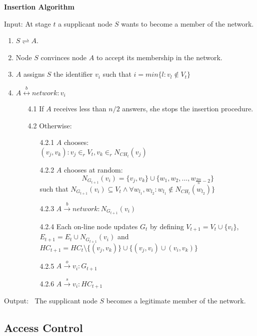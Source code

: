 \documentclass{article}
\begin{document}
{\bf Insertion Algorithm}

Input: At stage $t$ a supplicant node $S$ wants to become a member
of the network.
\begin{enumerate}
	\item $S\rightleftharpoons A$.
	\item Node $S$ convinces node $A$ to accept its membership in the network.
  \item  $A$ assigns $S$ the identifier $v_i$ such that $i = min \{l: v_l \not \in V_t \}$
  \item $ A \stackrel{b}{\leftrightarrow} network: v_i$ 
  \begin {itemize}
      \item [4.1] If $A$ receives less than $n/2$ answers, she stops the insertion procedure.
      \item [4.2]Otherwise:
      \begin{itemize}
            \item [4.2.1]$A$ chooses:\\
            $(v_j,v_k): v_j\in _r V_t,v_k \in _r N_{CH_t}(v_j)$
            \item [4.2.2]$A$ chooses at random:\\
            $$N_{G_{t+1}}(v_i)= \{v_j, v_k\} \cup \{ w_1,w_2,..., w_{\frac{2m}{n} -2}\}$$  such that
            $ N_{G_{t+1}}(v_i) \subseteq V_t \wedge \forall w_{l_1},w_{l_2}: w_{l_1} \not \in N_{CH_t}(w_{l_2})\}$
            \item [4.2.3] $ A \stackrel{b}{\rightarrow} network: N_{G_{t+1}}(v_i)$
            \item [4.2.4]Each on-line node updates $G_t$ by defining $V_{t+1}=V_t \cup \{v_i\}$, $E_{t+1}=E_t \cup 							N_{G_{t+1}}(v_i)$ and
     				$HC_{t+1}= HC_t \setminus \{(v_j, v_k)\} \cup \{(v_j,v_i) \cup (v_i, v_k)\}$
    				\item [4.2.5] $A \stackrel{o}{\rightarrow} v_i: G_{t+1}$
    				\item [4.2.6] $A \stackrel{s}{\rightarrow} v_i: HC_{t+1}$
    	\end{itemize}
  \end{itemize}
\end {enumerate}

Output: $\ $ The supplicant node $S$ becomes a legitimate member of the
network.

\subsection{Access Control}
\label{Sub:AcCont}
\end{document}

